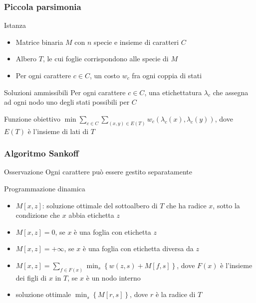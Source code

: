 \begin{frame}[fragile]
\frametitle{Piccola parsimonia}
\begin{block}{Istanza}
\begin{itemize}
\item
Matrice binaria $M$ con $n$ specie e insieme di caratteri $C$
\item
Albero $T$, le cui foglie corrispondono alle specie di $M$
\item
Per ogni carattere $c\in C$, un costo $w_{c}$ fra ogni coppia di stati
\end{itemize}
\end{block}
\begin{block}{Soluzioni ammissibili}
Per ogni carattere $c\in C$, una etichettatura $\lambda_{c}$ che assegna ad ogni nodo
uno degli stati possibili per $C$
\end{block}
\begin{block}{Funzione obiettivo}
$\min \sum_{c\in C} \sum_{(x,y)\in E(T)} w_{c}(\lambda_{c}(x), \lambda_{c}(y))$, dove $E(T)$ è
l'insieme di lati di $T$
\end{block}
\end{frame}

\begin{frame}[fragile]
\frametitle{Algoritmo Sankoff}
\begin{block}{Osservazione}
Ogni carattere può essere gestito separatamente
\end{block}

\begin{block}{Programmazione dinamica}
\begin{itemize}
\item
$M[x,z]$: soluzione ottimale del sottoalbero di $T$ che ha radice $x$, sotto la
condizione che $x$ abbia etichetta $z$
\item
$M[x,z] = 0$, se $x$ è una foglia con etichetta $z$
\item
$M[x,z] = +\infty$, se $x$ è una foglia con etichetta diversa da $z$
\item
$M[x,z] = \sum_{f \in F(x)} \min_{s} \left\{ w(z,s) + M[f,s] \right\}$, dove $F(x)$ è
l'insieme dei figli di $x$ in $T$, se $x$ è un nodo interno
\item
soluzione ottimale $\min_{s} \left\{ M[r,s] \right\}$, dove $r$ è la radice di
$T$
\end{itemize}
\end{block}
\end{frame}


